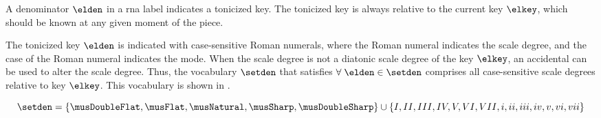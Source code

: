 
A denominator $\elden$ in a \gls{rna} label indicates a
tonicized key. The tonicized key is always relative to the
current key $\elkey$, which should be known at any given
moment of the piece.

The tonicized key $\elden$ is indicated with case-sensitive
Roman numerals, where the Roman numeral indicates the scale
degree, and the case of the Roman numeral indicates the
mode. When the scale degree is not a diatonic scale degree
of the key $\elkey$, an accidental can be used to alter the
scale degree. Thus, the vocabulary $\setden$ that satisfies
$\forall \; \elden \in \setden$ comprises all case-sensitive
scale degrees relative to key $\elkey$. This vocabulary is
shown in .

\begin{equation}
    \setden = \{ \musDoubleFlat, \musFlat, \musNatural, 
    \musSharp, \musDoubleSharp \} \cup \{ I, II, III, IV, V, VI, VII, 
    i, ii, iii, iv, v, vi, vii \}
\end{equation}
